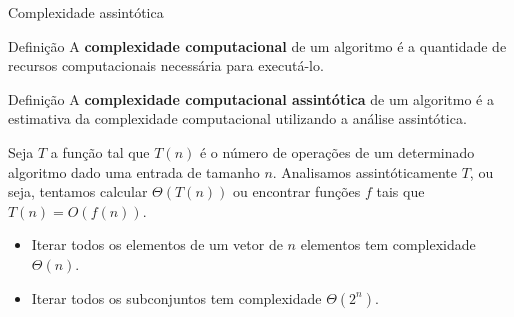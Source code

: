 \begin{frame}{Complexidade assintótica}

    \begin{block}{Definição}
        A {\bf complexidade computacional} de um algoritmo é a quantidade de recursos computacionais necessária para executá-lo.
    \end{block} \pause

    \begin{block}{Definição}
        A {\bf complexidade computacional assintótica} de um algoritmo é a estimativa da complexidade computacional utilizando a análise assintótica.
    \end{block} \pause

    Seja $T$ a função tal que $T(n)$ é o número de operações de um determinado algoritmo dado uma entrada de tamanho $n$. \pause Analisamos assintóticamente $T$, ou seja, tentamos calcular $\Theta(T(n))$ ou encontrar funções $f$ tais que $T(n) = O(f(n))$. \pause

    \begin{itemize}
        \item[(i)] Iterar todos os elementos de um vetor de $n$ elementos tem complexidade $\Theta(n)$. \pause
        \item[(ii)] Iterar todos os subconjuntos tem complexidade $\Theta(2^n)$.
    \end{itemize}
\end{frame}


